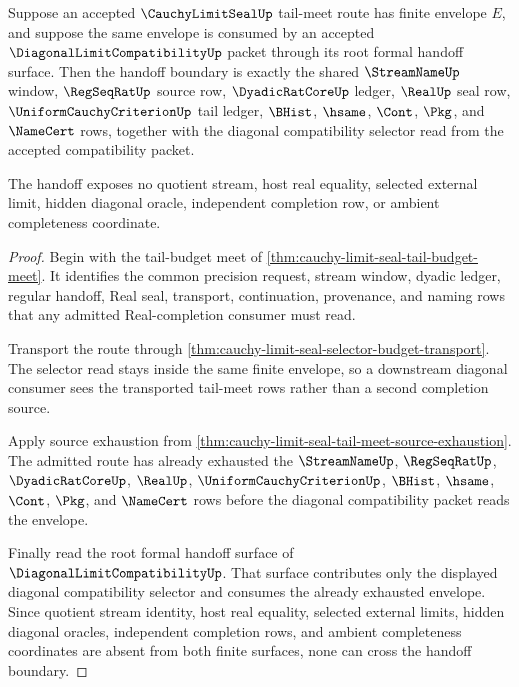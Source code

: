 \begin{theorem}
\label{thm:cauchy-limit-seal-tail-meet-diagonal-compatibility-handoff}
Suppose an accepted $\CauchyLimitSealUp$ tail-meet route has finite envelope $E$, and suppose the same envelope is consumed by an accepted $\DiagonalLimitCompatibilityUp$ packet through its root formal handoff surface. Then the handoff boundary is exactly the shared $\StreamNameUp$ window, $\RegSeqRatUp$ source row, $\DyadicRatCoreUp$ ledger, $\RealUp$ seal row, $\UniformCauchyCriterionUp$ tail ledger, $\BHist$, $\hsame$, $\Cont$, $\Pkg$, and $\NameCert$ rows, together with the diagonal compatibility selector read from the accepted compatibility packet.

The handoff exposes no quotient stream, host real equality, selected external limit, hidden diagonal oracle, independent completion row, or ambient completeness coordinate.
\end{theorem}
\begin{proof}
Begin with the tail-budget meet of \autoref{thm:cauchy-limit-seal-tail-budget-meet}. It identifies the common precision request, stream window, dyadic ledger, regular handoff, Real seal, transport, continuation, provenance, and naming rows that any admitted Real-completion consumer must read.

Transport the route through \autoref{thm:cauchy-limit-seal-selector-budget-transport}. The selector read stays inside the same finite envelope, so a downstream diagonal consumer sees the transported tail-meet rows rather than a second completion source.

Apply source exhaustion from \autoref{thm:cauchy-limit-seal-tail-meet-source-exhaustion}. The admitted route has already exhausted the $\StreamNameUp$, $\RegSeqRatUp$, $\DyadicRatCoreUp$, $\RealUp$, $\UniformCauchyCriterionUp$, $\BHist$, $\hsame$, $\Cont$, $\Pkg$, and $\NameCert$ rows before the diagonal compatibility packet reads the envelope.

Finally read the root formal handoff surface of $\DiagonalLimitCompatibilityUp$. That surface contributes only the displayed diagonal compatibility selector and consumes the already exhausted envelope. Since quotient stream identity, host real equality, selected external limits, hidden diagonal oracles, independent completion rows, and ambient completeness coordinates are absent from both finite surfaces, none can cross the handoff boundary.
\end{proof}

